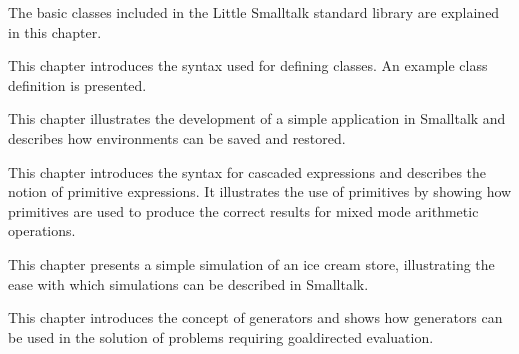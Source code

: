


\secdown





\secdown

The basic classes included in the Little Smalltalk standard library are
explained in this chapter.


\secup

\secdown

This chapter introduces the syntax used for defining classes. An example class definition is presented.


\secup

\secdown

This chapter illustrates the development of a simple application in
Smalltalk and describes how environments can be saved and restored.


\secup

\secdown

This chapter introduces the syntax for cascaded expressions and describes the notion of primitive expressions. It illustrates the use of
primitives by showing how primitives are used to produce the correct
results for mixed mode arithmetic operations.


\secup

\secdown

This chapter presents a simple simulation of an ice cream store, illustrating the ease with which simulations can be described in Smalltalk.


\secup

\secdown

This chapter introduces the concept of generators and shows how
generators can be used in the solution of problems requiring goaldirected evaluation.

